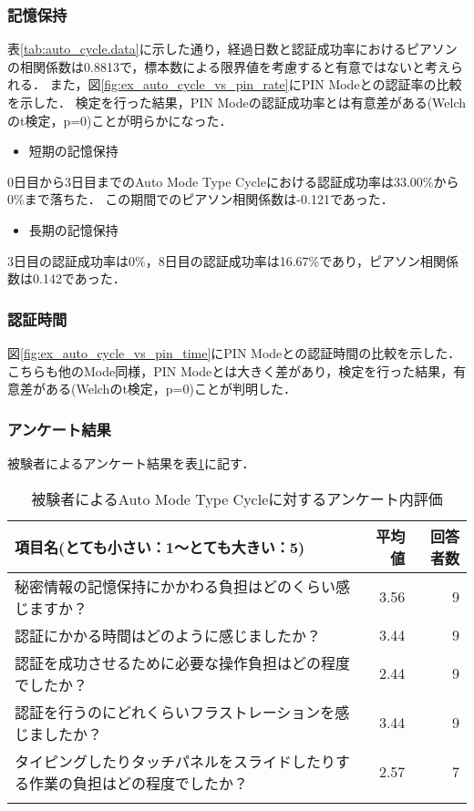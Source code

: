 \subsubsection{記憶保持}
表\ref{tab:auto_cycle.data}に示した通り，経過日数と認証成功率におけるピアソンの相関係数は0.8813で，標本数による限界値を考慮すると有意ではないと考えられる．
また，図\ref{fig:ex_auto_cycle_vs_pin_rate}にPIN Modeとの認証率の比較を示した．
検定を行った結果，PIN Modeの認証成功率とは有意差がある(Welchのt検定，p=0)ことが明らかになった．
\begin{itemize}
  \item 短期の記憶保持
\end{itemize}
0日目から3日目までのAuto Mode Type Cycleにおける認証成功率は33.00\%から0\%まで落ちた．
この期間でのピアソン相関係数は-0.121であった．

\begin{itemize}
  \item 長期の記憶保持
\end{itemize}
3日目の認証成功率は0\%，8日目の認証成功率は16.67\%であり，ピアソン相関係数は0.142であった．

\subsubsection{認証時間}
図\ref{fig:ex_auto_cycle_vs_pin_time}にPIN Modeとの認証時間の比較を示した．
こちらも他のMode同様，PIN Modeとは大きく差があり，検定を行った結果，有意差がある(Welchのt検定，p=0)ことが判明した．

\subsubsection{アンケート結果}
被験者によるアンケート結果を表\ref{tab:auto_cycle.enquete}に記す．
\begin{table}[ht]
  \caption{被験者によるAuto Mode Type Cycleに対するアンケート内評価}
  \label{tab:auto_cycle.enquete}
  \begin{center}
    \small
    \begin{tabular}{lrr}
      \bhline
      項目名(とても小さい：1〜とても大きい：5) & 平均値 & 回答者数 \\ \hline
      秘密情報の記憶保持にかかわる負担はどのくらい感じますか？ & 3.56 & 9 \\
      認証にかかる時間はどのように感じましたか？ & 3.44 & 9 \\
      認証を成功させるために必要な操作負担はどの程度でしたか？ & 2.44 & 9 \\
      認証を行うのにどれくらいフラストレーションを感じましたか？ & 3.44 & 9 \\
      タイピングしたりタッチパネルをスライドしたりする作業の負担はどの程度でしたか？ & 2.57 & 7 \\
      \bhline
    \end{tabular}
  \end{center}
\end{table}


